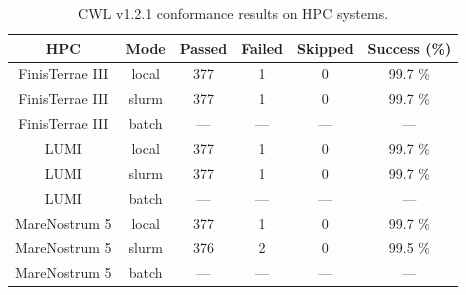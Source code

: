 \documentclass{article}
\begin{document}
\begin{table}[ht!]
\centering
\setlength{\tabcolsep}{6pt}
\renewcommand{\arraystretch}{1.2}
\begin{tabular}{|c|c|c|c|c|c|}
\hline
\rowcolor{lightgray!50}
\textbf{HPC} & \textbf{Mode} & \textbf{Passed} & \textbf{Failed} & \textbf{Skipped} & \textbf{Success (\%)} \\
\hline
FinisTerrae III & local & 377 & 1 & 0 & 99.7 \% \\
FinisTerrae III & slurm & 377 & 1 & 0 & 99.7 \% \\
FinisTerrae III & batch & — & — & — & — \\
\hline\hline
LUMI & local & 377 & 1 & 0 & 99.7 \% \\
LUMI & slurm & 377 & 1 & 0 & 99.7 \% \\
LUMI & batch & — & — & — & — \\
\hline\hline
MareNostrum 5 & local & 377 & 1 & 0 & 99.7 \% \\
MareNostrum 5 & slurm & 376 & 2 & 0 & 99.5 \% \\
MareNostrum 5 & batch & — & — & — & — \\
\hline
\end{tabular}
\caption{CWL v1.2.1 conformance results on HPC systems.}
\label{tab:cwltool_v12}
\end{table}
\clearpage
\end{document}
